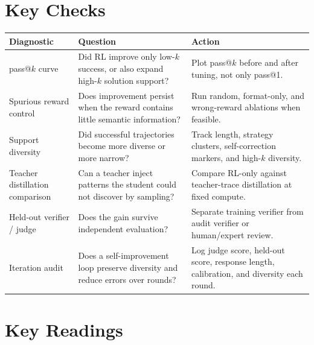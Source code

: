 \section*{Key Checks}

\begin{center}
\small
\begin{tabularx}{\textwidth}{@{}p{3.5cm}p{5cm}X@{}}
\toprule
\textbf{Diagnostic} & \textbf{Question} & \textbf{Action} \\
\midrule
pass@$k$ curve & Did RL improve only low-$k$ success, or also expand high-$k$ solution support? & Plot pass@$k$ before and after tuning, not only pass@1. \\
Spurious reward control & Does improvement persist when the reward contains little semantic information? & Run random, format-only, and wrong-reward ablations when feasible. \\
Support diversity & Did successful trajectories become more diverse or more narrow? & Track length, strategy clusters, self-correction markers, and high-$k$ diversity. \\
Teacher distillation comparison & Can a teacher inject patterns the student could not discover by sampling? & Compare RL-only against teacher-trace distillation at fixed compute. \\
Held-out verifier / judge & Does the gain survive independent evaluation? & Separate training verifier from audit verifier or human/expert review. \\
Iteration audit & Does a self-improvement loop preserve diversity and reduce errors over rounds? & Log judge score, held-out score, response length, calibration, and diversity each round. \\
\bottomrule
\end{tabularx}
\normalsize
\end{center}


\section*{Key Readings}

